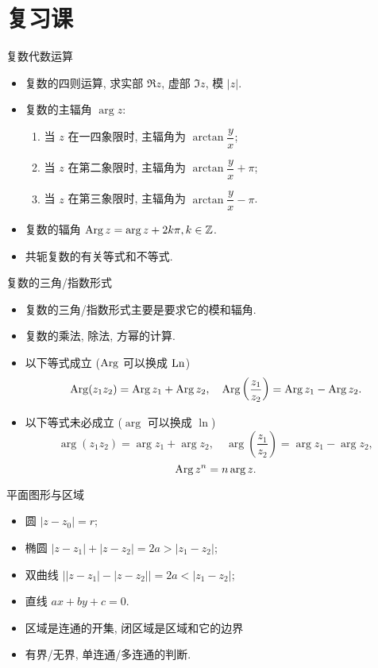 \documentclass[12pt]{ctexbeamer}
\begin{document}
\frame{\titlepage}
\setlength{\parindent}{2em}
\setcounter{part}{6}
\part{复习课}

\begin{frame}{复数代数运算}
\begin{itemize}
\item 复数的四则运算, 求实部 $\Re z$, 虚部 $\Im z$, 模 $|z|$.
\item 复数的主辐角 $\arg z$:
\begin{enumerate}
\item 当 $z$ 在一四象限时, 主辐角为 $\arctan\dfrac yx$;
\item 当 $z$ 在第二象限时, 主辐角为 $\arctan\dfrac yx+\pi$;
\item 当 $z$ 在第三象限时, 主辐角为 $\arctan\dfrac yx-\pi$.
\end{enumerate}
\item 复数的辐角 $\operatorname{Arg} z=\arg z+2k\pi,k\in{\mathbb{Z}}$.
\item 共轭复数的有关等式和不等式.
\end{itemize}
\end{frame}


\begin{frame}{复数的三角/指数形式}
\begin{itemize}
\item 复数的三角/指数形式主要是要求它的模和辐角.
\item 复数的乘法, 除法, 方幂的计算.
\item 以下等式成立 ($\operatorname{Arg}$ 可以换成 $\operatorname{Ln}$)
\[\operatorname{Arg} (z_1z_2)=\operatorname{Arg} z_1+\operatorname{Arg} z_2,\quad 
\operatorname{Arg}\left(\frac{z_1}{z_2}\right)=\operatorname{Arg} z_1-\operatorname{Arg} z_2.\]
\item 以下等式未必成立 ($\arg$ 可以换成 $\ln$)
\[\arg (z_1z_2)=\arg z_1+\arg z_2,\quad 
\arg\left(\frac{z_1}{z_2}\right)=\arg z_1-\arg z_2,\]
\[\operatorname{Arg} z^n=n\arg z.\]
\end{itemize}
\end{frame}


\begin{frame}{平面图形与区域}
\begin{itemize}
\item 圆 $|z-z_0|=r$;
\item 椭圆 $|z-z_1|+|z-z_2|=2a>|z_1-z_2|$;
\item 双曲线 $\bigl||z-z_1|-|z-z_2|\bigr|=2a<|z_1-z_2|$;
\item 直线 $ax+by+c=0$.
\item 区域是连通的开集, 闭区域是区域和它的边界
\item 有界/无界, 单连通/多连通的判断.
\end{itemize}
\end{frame}
\end{document}
